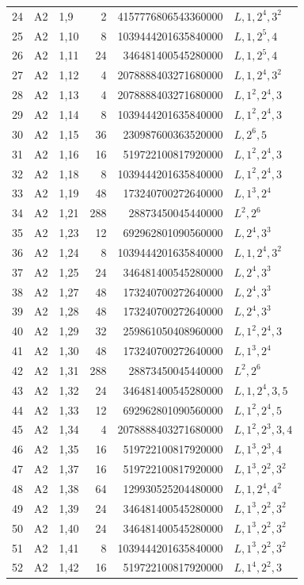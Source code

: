 \begin{longtable}{rllrrl}
24&A2&1,9&2&4157776806543360000&$L,1,2^{4},3^{2}$\\
25&A2&1,10&8&1039444201635840000&$L,1,2^{5},4$\\
26&A2&1,11&24&346481400545280000&$L,1,2^{5},4$\\
27&A2&1,12&4&2078888403271680000&$L,1,2^{4},3^{2}$\\
28&A2&1,13&4&2078888403271680000&$L,1^{2},2^{4},3$\\
29&A2&1,14&8&1039444201635840000&$L,1^{2},2^{4},3$\\
30&A2&1,15&36&230987600363520000&$L,2^{6},5$\\
31&A2&1,16&16&519722100817920000&$L,1^{2},2^{4},3$\\
32&A2&1,18&8&1039444201635840000&$L,1^{2},2^{4},3$\\
33&A2&1,19&48&173240700272640000&$L,1^{3},2^{4}$\\
34&A2&1,21&288&28873450045440000&$L^{2},2^{6}$\\
35&A2&1,23&12&692962801090560000&$L,2^{4},3^{3}$\\
36&A2&1,24&8&1039444201635840000&$L,1,2^{4},3^{2}$\\
37&A2&1,25&24&346481400545280000&$L,2^{4},3^{3}$\\
38&A2&1,27&48&173240700272640000&$L,2^{4},3^{3}$\\
39&A2&1,28&48&173240700272640000&$L,2^{4},3^{3}$\\
40&A2&1,29&32&259861050408960000&$L,1^{2},2^{4},3$\\
41&A2&1,30&48&173240700272640000&$L,1^{3},2^{4}$\\
42&A2&1,31&288&28873450045440000&$L^{2},2^{6}$\\
43&A2&1,32&24&346481400545280000&$L,1,2^{4},3,5$\\
44&A2&1,33&12&692962801090560000&$L,1^{2},2^{4},5$\\
45&A2&1,34&4&2078888403271680000&$L,1^{2},2^{3},3,4$\\
46&A2&1,35&16&519722100817920000&$L,1^{3},2^{3},4$\\
47&A2&1,37&16&519722100817920000&$L,1^{3},2^{2},3^{2}$\\
48&A2&1,38&64&129930525204480000&$L,1,2^{4},4^{2}$\\
49&A2&1,39&24&346481400545280000&$L,1^{3},2^{2},3^{2}$\\
50&A2&1,40&24&346481400545280000&$L,1^{3},2^{2},3^{2}$\\
51&A2&1,41&8&1039444201635840000&$L,1^{3},2^{2},3^{2}$\\
52&A2&1,42&16&519722100817920000&$L,1^{4},2^{2},3$\\

\end{longtable}
